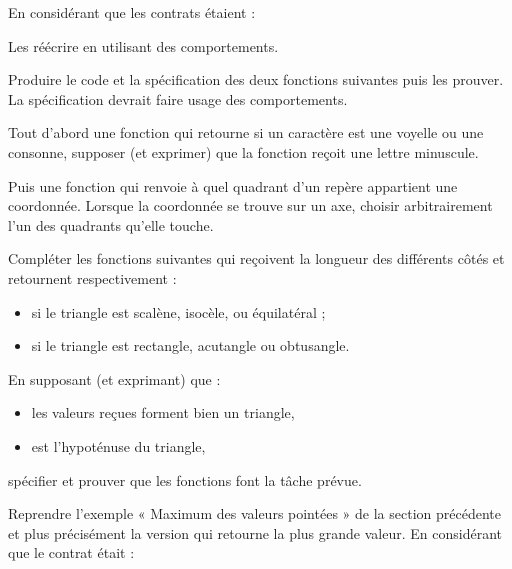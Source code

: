 En considérant que les contrats étaient :




Les réécrire en utilisant des comportements.




Produire le code et la spécification des deux fonctions suivantes puis
les prouver. La spécification devrait faire usage des comportements.


Tout d'abord une fonction qui retourne si un caractère est une voyelle
ou une consonne, supposer (et exprimer) que la fonction reçoit une
lettre minuscule.




Puis une fonction qui renvoie à quel quadrant d'un repère appartient
une coordonnée. Lorsque la coordonnée se trouve sur un axe, choisir
arbitrairement l'un des quadrants qu'elle touche.






Compléter les fonctions suivantes qui reçoivent la longueur des différents
côtés et retournent respectivement :
\begin{itemize}
\item si le triangle est scalène, isocèle, ou équilatéral ;
\item si le triangle est rectangle, acutangle ou obtusangle.
\end{itemize}




En supposant (et exprimant) que :


\begin{itemize}
\item les valeurs reçues forment bien un triangle,
\item {} est l'hypoténuse du triangle,
\end{itemize}


spécifier et prouver que les fonctions font la tâche prévue.




Reprendre l'exemple « Maximum des valeurs pointées » de la section
précédente et plus précisément la version qui retourne la plus grande
valeur. En considérant que le contrat était :




